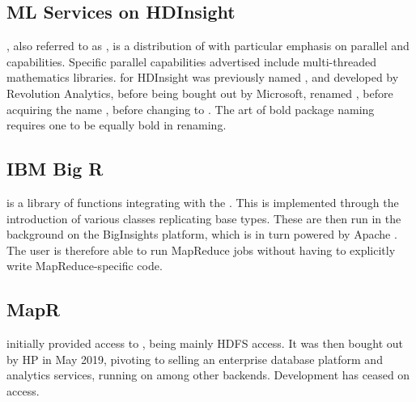 \subsection{ML Services on HDInsight}\label{subsec:r-server-hdinsight}

, also referred to as , is a distribution of \R{} with particular emphasis on parallel and capabilities\cite{azure16:_r_server_hdins_r_analy}.
Specific parallel capabilities advertised include multi-threaded mathematics libraries.
 for HDInsight was previously named , and developed by Revolution Analytics, before being bought out by Microsoft, renamed , before acquiring the name , before changing to .
The art of bold package naming requires one to be equally bold in renaming.

\subsection{IBM Big R}\label{subsec:ibm-big-r}

 is a library of functions integrating \R{} with the \cite{inc.14:_infos_bigin_big_r}.
This is implemented through the introduction of various  classes replicating base \R{} types.
These are then run in the background on the BigInsights platform, which is in turn powered by Apache .
The user is therefore able to run MapReduce jobs without having to explicitly write MapReduce-specific code.

\subsection{MapR}\label{sec:mapr}

 initially provided \R{} access to , being mainly HDFS
access\cite{mapr19:_indus_next_gener_data_platf_ai_analy}.
It was then bought out by HP in May 2019, pivoting to selling an enterprise database platform and analytics services, running on  among other backends.
Development has ceased on \R{} access.
